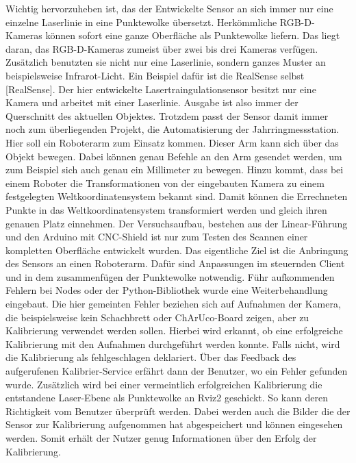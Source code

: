 	Wichtig hervorzuheben ist, das der Entwickelte Sensor an sich immer nur eine einzelne Laserlinie in eine Punktewolke übersetzt. Herkömmliche RGB-D-Kameras können sofort eine ganze Oberfläche als Punktewolke liefern. Das liegt daran, das RGB-D-Kameras zumeist über zwei bis drei Kameras verfügen. Zusätzlich benutzten sie nicht nur eine Laserlinie, sondern ganzes Muster an beispielsweise Infrarot-Licht. Ein Beispiel dafür ist die RealSense selbst [RealSense]. Der hier entwickelte Lasertraingulationsensor besitzt nur eine Kamera und arbeitet mit einer Laserlinie. Ausgabe ist also immer der Querschnitt des aktuellen Objektes. Trotzdem passt der Sensor damit immer noch zum überliegenden Projekt, die Automatisierung der Jahrringmessstation. Hier soll ein Roboterarm zum Einsatz kommen. Dieser Arm kann sich über das Objekt bewegen. Dabei können genau Befehle an den Arm gesendet werden, um zum Beispiel sich auch genau ein Millimeter zu bewegen. Hinzu kommt, dass bei einem Roboter die Transformationen von der eingebauten Kamera zu einem festgelegten Weltkoordinatensystem bekannt sind. Damit können die Errechneten Punkte in das Weltkoordinatensystem transformiert werden und gleich ihren genauen Platz einnehmen. Der Versuchsaufbau, bestehen aus der Linear-Führung und den Arduino mit CNC-Shield ist nur zum Testen des Scannen einer kompletten Oberfläche entwickelt wurden. Das eigentliche Ziel ist die Anbringung des Sensors an einen Roboterarm. Dafür sind Anpassungen im steuernden Client und in dem zusammenfügen der Punktewolke notwendig. \newline
	Führ aufkommenden Fehlern bei Nodes oder der Python-Bibliothek wurde eine Weiterbehandlung eingebaut. Die hier gemeinten Fehler beziehen sich auf Aufnahmen der Kamera, die beispielsweise kein Schachbrett oder ChArUco-Board zeigen, aber zu Kalibrierung verwendet werden sollen. Hierbei wird erkannt, ob eine erfolgreiche Kalibrierung mit den Aufnahmen durchgeführt werden konnte. Falls nicht, wird die Kalibrierung als fehlgeschlagen deklariert. Über das Feedback des aufgerufenen Kalibrier-Service erfährt dann der Benutzer, wo ein Fehler gefunden wurde. Zusätzlich wird bei einer vermeintlich erfolgreichen Kalibrierung die entstandene Laser-Ebene als Punktewolke an Rviz2 geschickt. So kann deren Richtigkeit vom Benutzer überprüft werden. Dabei werden auch die Bilder die der Sensor zur Kalibrierung aufgenommen hat abgespeichert und können eingesehen werden. Somit erhält der Nutzer genug Informationen über den Erfolg der Kalibrierung. 
